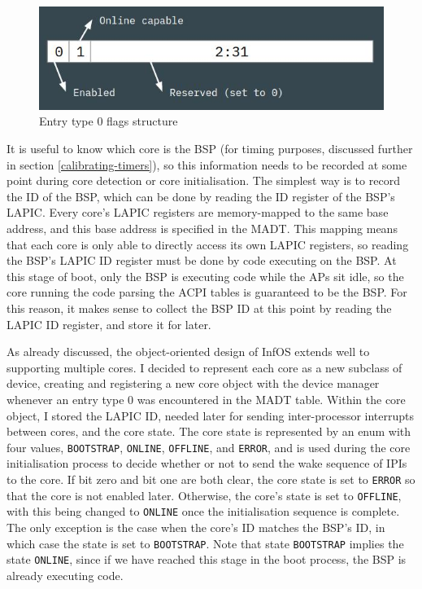 \documentclass[bsc,frontabs,twoside,singlespacing,parskip,deptreport]{infthesis}     %
\begin{document}
\begin{figure}[h]
    \centering
    \includegraphics[scale=0.6]{figures/entry0flags.jpg}
    \caption{Entry type 0 flags structure}
    \label{entry0flags}
\end{figure}

It is useful to know which core is the BSP (for timing purposes, discussed further in section \ref{calibrating-timers}), so this information needs to be recorded at some point during core detection or core initialisation. The simplest way is to record the ID of the BSP, which can be done by reading the ID register of the BSP's LAPIC. Every core's LAPIC registers are memory-mapped to the same base address, and this base address is specified in the MADT. This mapping means that each core is only able to directly access its own LAPIC registers, so reading the BSP's LAPIC ID register must be done by code executing on the BSP. At this stage of boot, only the BSP is executing code while the APs sit idle, so the core running the code parsing the ACPI tables is guaranteed to be the BSP. For this reason, it makes sense to collect the BSP ID at this point by reading the LAPIC ID register, and store it for later.

As already discussed, the object-oriented design of InfOS extends well to supporting multiple cores. I decided to represent each core as a new subclass of device, creating and registering a new core object with the device manager whenever an entry type 0 was encountered in the MADT table. Within the core object, I stored the LAPIC ID, needed later for sending inter-processor interrupts between cores, and the core state. The core state is represented by an enum with four values, \verb|BOOTSTRAP|, \verb|ONLINE|, \verb|OFFLINE|, and \verb|ERROR|, and is used during the core initialisation process to decide whether or not to send the wake sequence of IPIs to the core. If bit zero and bit one are both clear, the core state is set to \verb|ERROR| so that the core is not enabled later. Otherwise, the core's state is set to \verb|OFFLINE|, with this being changed to \verb|ONLINE| once the initialisation sequence is complete. The only exception is the case when the core's ID matches the BSP's ID, in which case the state is set to \verb|BOOTSTRAP|. Note that state \verb|BOOTSTRAP| implies the state \verb|ONLINE|, since if we have reached this stage in the boot process, the BSP is already executing code.
\end{document}
